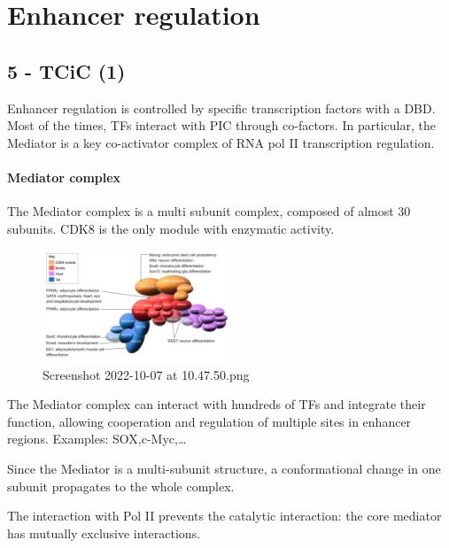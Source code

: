 \graphicspath{{chapters/_resources/}}

\chapter{Enhancer regulation}



\hypertarget{tcic-1}{%
\section{5 - TCiC (1)}\label{tcic-1}}

Enhancer regulation is controlled by specific transcription factors with a DBD. Most of the times, TFs interact with PIC through co-factors. In particular, the Mediator is a key co-activator complex of RNA pol II transcription regulation.

\hypertarget{mediator-complex}{%
\subsubsection{Mediator complex}\label{mediator-complex}}

The Mediator complex is a multi subunit complex, composed of almost 30 subunits. CDK8 is the only module with enzymatic activity.

\begin{figure}
\centering
\includegraphics[width=0.5\textwidth]{../_resources/Screenshot_2022-10-07_at_10-47-50.png}
\caption{Screenshot 2022-10-07 at 10.47.50.png}
\end{figure}

The Mediator complex can interact with hundreds of TFs and integrate their function, allowing cooperation and regulation of multiple sites in enhancer regions. Examples: SOX,c-Myc,\ldots{}

Since the Mediator is a multi-subunit structure, a conformational change in one subunit propagates to the whole complex.

The interaction with Pol II prevents the catalytic interaction: the core mediator has mutually exclusive interactions.

